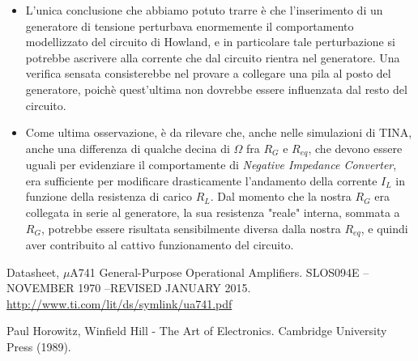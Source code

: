 \documentclass[journal, a4paper]{IEEEtran}
\begin{document}
\begin{itemize}
\item L'unica conclusione che abbiamo potuto trarre è che l'inserimento di un generatore di tensione perturbava enormemente il comportamento modellizzato del circuito di Howland, e in particolare tale perturbazione si potrebbe ascrivere alla corrente che dal circuito rientra nel generatore. Una verifica sensata consisterebbe nel provare a collegare una pila al posto del generatore, poichè quest'ultima non dovrebbe essere influenzata dal resto del circuito.

\item Come ultima osservazione, è da rilevare che, anche nelle simulazioni di TINA, anche una differenza di qualche decina di $\Omega$ fra $R_G$ e $R_{eq}$, che devono essere uguali per evidenziare il comportamente di \textit{Negative Impedance Converter}, era sufficiente per modificare drasticamente l'andamento della corrente $I_L$ in funzione della resistenza di carico $R_L$. Dal momento che la nostra $R_G$ era collegata in serie al generatore, la sua resistenza "reale" interna, sommata a $R_G$, potrebbe essere risultata sensibilmente diversa dalla nostra $R_{eq}$, e quindi aver contribuito al cattivo funzionamento del circuito.

\end{itemize}
\begin{thebibliography}{5}

	Datasheet, $\mu $A741 General-Purpose Operational Amplifiers. SLOS094E – NOVEMBER 1970  –REVISED JANUARY 2015.
	\url{http://www.ti.com/lit/ds/symlink/ua741.pdf}


	Paul Horowitz, Winfield Hill - The Art of Electronics. Cambridge University Press (1989).
	
\end{thebibliography}

\end{document}
